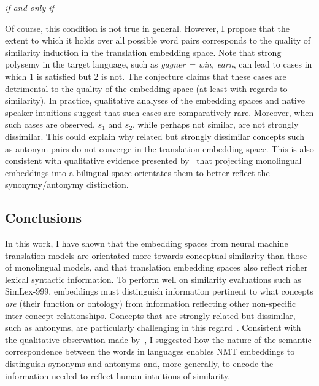 {\centering \emph{if and only if} \\}


Of course, this condition is not true in general. However, I propose that the extent to which it holds over all possible word pairs corresponds to the quality of similarity induction in the translation embedding space. Note that strong polysemy in the target language, such as \emph{gagner = win, earn}, can lead to cases in which \(1\) is satisfied but \(2\) is not. The conjecture claims that these cases are detrimental to the quality of the embedding space (at least with regards to similarity). In practice, qualitative analyses of the embedding spaces and native speaker intuitions suggest that such cases are comparatively rare. Moreover, when such cases are observed, \(s_1\) and \(s_2\), while perhaps not similar, are not strongly dissimilar. This could explain why related but strongly dissimilar concepts such as antonym pairs do not converge in the translation embedding space. This is also consistent with qualitative evidence presented by~\cite{faruqui2014improving} that projecting monolingual embeddings into a bilingual space orientates them to better reflect the synonymy/antonymy distinction.
    

\subsection{Conclusions}

In this work, I have shown that the embedding spaces from neural machine translation models are orientated more towards conceptual similarity than those of monolingual models, and that translation embedding spaces also reflect richer lexical syntactic information. To perform well on similarity evaluations such as SimLex-999, embeddings must distinguish information pertinent to what concepts \emph{are} (their function or ontology) from information reflecting other non-specific inter-concept relationships. Concepts that are strongly related but dissimilar, such as antonyms, are particularly challenging in this regard~\citep{hill2014simlex}. Consistent with the qualitative observation made by~\cite{faruqui2014improving}, I suggested how the nature of the semantic correspondence between the words in languages enables NMT embeddings to distinguish synonyms and antonyms and, more generally, to encode the information needed to reflect human intuitions of similarity.   

